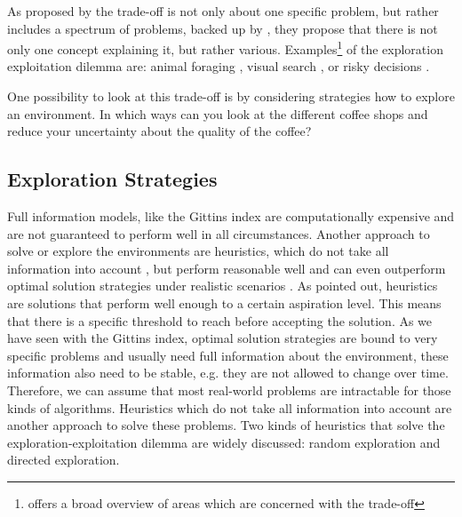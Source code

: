 As proposed by \cite{cohen2007should} the trade-off is not only about one specific problem, but rather includes a spectrum of problems, backed up by \cite{mehlhorn2015unpacking}, they propose that there is not only one concept explaining it, but rather various. %
Examples\footnote{\cite{hills2015exploration} offers a broad overview of areas which are concerned with the trade-off} of the exploration exploitation dilemma are: animal foraging \citep{cook2013exploration}, visual search \citep{chun1996just}, or risky decisions \citep{gonzalez2011instance, analytis2019make, schulz2018generalization}.


One possibility to look at this trade-off is by considering strategies how to explore an environment. In which ways can you look at the different coffee shops and reduce your uncertainty about the quality of the coffee? 

\subsection{Exploration Strategies}
Full information models, like the Gittins index are computationally expensive and are not guaranteed to perform well in all circumstances. %
Another approach to solve or explore the environments are heuristics, which do not take all information into account \citep{parpart2018heuristics}, but perform reasonable well and can even outperform optimal solution strategies under realistic scenarios \citep{gigerenzer1996reasoning, gigerenzer1999simple, katsikopoulos2010robust}. As \cite{gigerenzer2009homo} pointed out, heuristics are solutions that perform well enough to a certain aspiration level. This means that there is a specific threshold to reach before accepting the solution. As we have seen with the Gittins index, optimal solution strategies are bound to very specific problems and usually need full information about the environment, these information also need to be stable, e.g. they are not allowed to change over time. Therefore, we can assume that most real-world problems are intractable for those kinds of algorithms. Heuristics which do not take all information into account are another approach to solve these problems. Two kinds of heuristics that solve the exploration-exploitation dilemma are widely discussed: random exploration and directed exploration.

